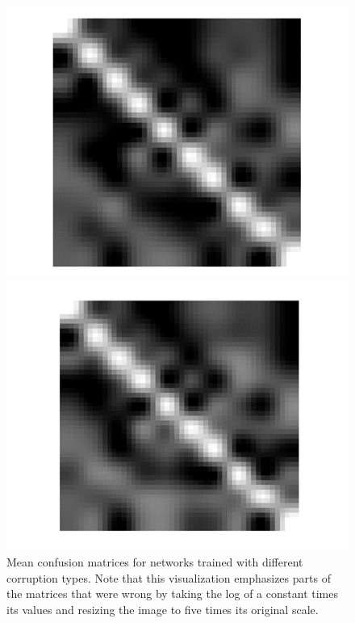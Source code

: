 \documentclass{article} %
\begin{document}
\begin{figure}[ht]
\begin{minipage}[b]{0.5\linewidth}
    \vspace{4ex}
  \end{minipage} 
  \begin{minipage}[b]{0.5\linewidth}
    \centering
    \includegraphics[width=\linewidth]{dropConfusionMat.png} 
    \vspace{4ex}
  \end{minipage}%
  \begin{minipage}[b]{0.5\linewidth}
    \centering
    \includegraphics[width=\linewidth]{saltPepperConfusionMat.png} 
    \vspace{4ex}
  \end{minipage} 
  \caption{Mean confusion matrices for networks trained with different corruption types. Note that this visualization emphasizes parts of the matrices that were wrong by taking the log of a constant times its values and resizing the image to five times its original scale.}
\end{figure}
\end{document}
